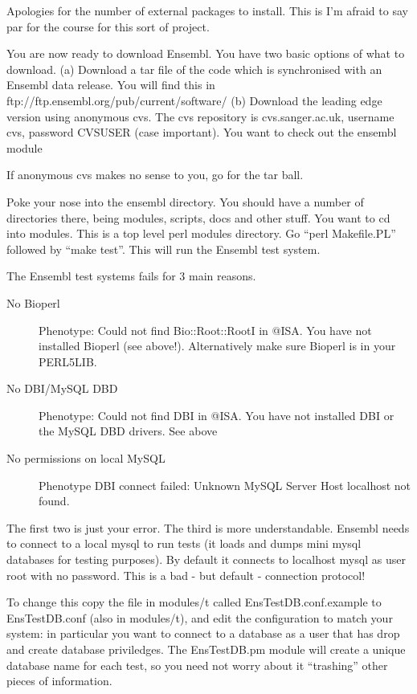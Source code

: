 \documentclass[11pt,a4paper]{article}
\begin{document}
Apologies for the number of external packages to install. This is I'm afraid to say 
par for the course for this sort of project.

You are now ready to download Ensembl. You have two basic options of
what to download.  (a) Download a tar file of the code which is
synchronised with an Ensembl data release.  You will find this in
ftp://ftp.ensembl.org/pub/current/software/ (b) Download the leading
edge version using anonymous cvs. The cvs repository is
cvs.sanger.ac.uk, username cvs, password CVSUSER (case important). You
want to check out the ensembl module

If anonymous cvs makes no sense to you, go for the tar ball.

Poke your nose into the ensembl directory. You should have a number of directories there, being
modules, scripts, docs and other stuff. You want to cd into modules. This is a top level 
perl modules directory. Go ``perl Makefile.PL'' followed by ``make test''. This will run the
Ensembl test system.

The Ensembl test systems fails for 3 main reasons.

\begin{description}
\item[No Bioperl] Phenotype: Could not find Bio::Root::RootI in @ISA. You have not installed Bioperl
(see above!). Alternatively make sure Bioperl is in your PERL5LIB.
\item[No DBI/MySQL DBD] Phenotype: Could not find DBI in @ISA. You have not installed DBI or the
MySQL DBD drivers. See above 

\item[No permissions on local MySQL]
Phenotype DBI connect failed: Unknown MySQL Server Host localhost not
found.  

\end{description} 

The first two is just your error. The third is more
understandable. Ensembl needs to connect to a local mysql to run tests
(it loads and dumps mini mysql databases for testing purposes). By
default it connects to localhost mysql as user root with no
password. This is a bad - but default - connection protocol!

To change this copy the file in modules/t called
EnsTestDB.conf.example to EnsTestDB.conf (also in modules/t), and edit
the configuration to match your system: in particular you want to
connect to a database as a user that has drop and create database
priviledges. The EnsTestDB.pm module will create a unique database
name for each test, so you need not worry about it ``trashing'' other
pieces of information.
\end{document}
